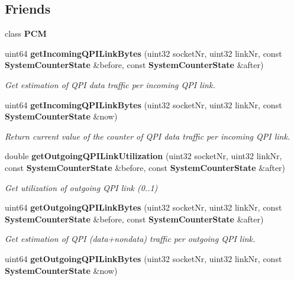 \subsection*{Friends}
\begin{DoxyCompactItemize}
\item 
class {\bfseries P\+CM}\label{classSystemCounterState_ab5f56d2e95ba3daf52c17b8a1d356d64}

\item 
uint64 {\bf get\+Incoming\+Q\+P\+I\+Link\+Bytes} (uint32 socket\+Nr, uint32 link\+Nr, const {\bf System\+Counter\+State} \&before, const {\bf System\+Counter\+State} \&after)
\begin{DoxyCompactList}\small\item\em Get estimation of Q\+PI data traffic per incoming Q\+PI link. \end{DoxyCompactList}\item 
uint64 {\bf get\+Incoming\+Q\+P\+I\+Link\+Bytes} (uint32 socket\+Nr, uint32 link\+Nr, const {\bf System\+Counter\+State} \&now)
\begin{DoxyCompactList}\small\item\em Return current value of the counter of Q\+PI data traffic per incoming Q\+PI link. \end{DoxyCompactList}\item 
double {\bf get\+Outgoing\+Q\+P\+I\+Link\+Utilization} (uint32 socket\+Nr, uint32 link\+Nr, const {\bf System\+Counter\+State} \&before, const {\bf System\+Counter\+State} \&after)
\begin{DoxyCompactList}\small\item\em Get utilization of outgoing Q\+PI link (0..1) \end{DoxyCompactList}\item 
uint64 {\bf get\+Outgoing\+Q\+P\+I\+Link\+Bytes} (uint32 socket\+Nr, uint32 link\+Nr, const {\bf System\+Counter\+State} \&before, const {\bf System\+Counter\+State} \&after)
\begin{DoxyCompactList}\small\item\em Get estimation of Q\+PI (data+nondata) traffic per outgoing Q\+PI link. \end{DoxyCompactList}\item 
uint64 {\bfseries get\+Outgoing\+Q\+P\+I\+Link\+Bytes} (uint32 socket\+Nr, uint32 link\+Nr, const {\bf System\+Counter\+State} \&now)\label{classSystemCounterState_a336f198b4a81e0d34bb581e8bd8be0e0}

\end{DoxyCompactItemize}
